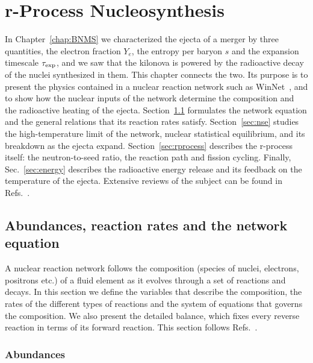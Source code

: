 \chapter{r-Process Nucleosynthesis}\label{ch:Nuclear_reaction_net}

In Chapter~\ref{chap:BNMS} we characterized the ejecta of a merger by three quantities, the electron fraction $Y_e$, the entropy per baryon $s$ and the expansion timescale $\tau_{\rm exp}$, and we saw that the kilonova is powered by the radioactive decay of the nuclei synthesized in them.
This chapter connects the two.
Its purpose is to present the physics contained in a nuclear reaction network such as WinNet~\cite{reichert_nuclear_2023}, and to show how the nuclear inputs of the network determine the composition and the radioactive heating of the ejecta.
Section~\ref{sec:network} formulates the network equation and the general relations that its reaction rates satisfy.
Section~\ref{sec:nse} studies the high-temperature limit of the network, nuclear statistical equilibrium, and its breakdown as the ejecta expand.
Section~\ref{sec:rprocess} describes the r-process itself: the neutron-to-seed ratio, the reaction path and fission cycling.
Finally, Sec.~\ref{sec:energy} describes the radioactive energy release and its feedback on the temperature of the ejecta.
Extensive reviews of the subject can be found in Refs.~\cite{arnould_r-process_2007,cowan_origin_2021}.

\section{Abundances, reaction rates and the network equation}\label{sec:network}

A nuclear reaction network follows the composition (species of nuclei, electrons, positrons etc.) of a fluid element as it evolves through a set of reactions and decays.
In this section we define the variables that describe the composition, the rates of the different types of reactions and the system of equations that governs the composition.
We also present the detailed balance, which fixes every reverse reaction in terms of its forward reaction.
This section follows Refs.~\cite{hix_computational_1999,lippuner_skynet_2017,reichert_nuclear_2023}.

\subsection{Abundances}\label{sec:abundances}

